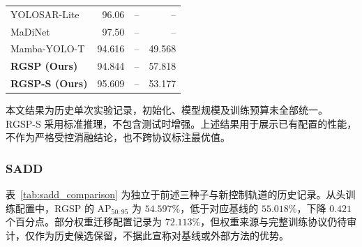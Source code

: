 \documentclass[journal]{IEEEtran}
\begin{document}
\begin{table}[!t]
\begin{tabular*}{\textwidth}{@{\extracolsep{\fill}}lrrr}
YOLOSAR-Lite   & 96.06 & -- & -- \\
MaDiNet        & 97.50 & -- & -- \\
\midrule
Mamba-YOLO-T   & 94.616 & -- & 49.568 \\
\textbf{RGSP (Ours)}
               & 94.844 & -- & 57.818 \\
\textbf{RGSP-S (Ours)}
               & 95.609 & -- & 53.177 \\
\bottomrule
\end{tabular*}
\smallskip
\begin{minipage}{\linewidth}
\footnotesize
本文结果为历史单次实验记录，初始化、模型规模及训练预算未全部统一。RGSP-S 采用标准推理，不包含测试时增强。上述结果用于展示已有配置的性能，不作为严格受控消融结论，也不跨协议标注最优值。
\end{minipage}
\end{table}

\subsubsection{SADD}
\label{sec:sadd_results}

表~\ref{tab:sadd_comparison} 为独立于前述三种子与新控制轨道的历史记录。从头训练配置中，RGSP 的 $\mathrm{AP}_{50:95}$ 为 $54.597\%$，低于对应基线的 $55.018\%$，下降 $0.421$ 个百分点。部分权重迁移配置记录为 $72.113\%$，但权重来源与完整训练协议仍待审计，仅作为历史候选保留，不据此宣称对基线或外部方法的优势。
\end{document}
